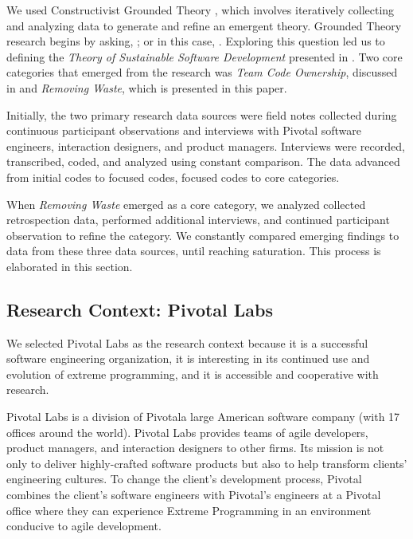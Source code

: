 We used Constructivist Grounded Theory \cite{Charmaz}, which involves iteratively collecting and analyzing data to generate and refine an emergent theory. Grounded Theory research begins by asking,  \cite{GlaserTheoreticalSensitivity}; or in this case, . Exploring this question led us to defining the \textit{Theory of Sustainable Software Development} presented in \cite{SedanoSustainableSoftware}. Two core categories that emerged from the research was \textit{Team Code Ownership}, discussed in \cite{SedanoTeamCodeOwnership} and \textit{Removing Waste}, which is presented in this paper.

Initially, the two primary research data sources were field notes collected during continuous participant observations and interviews with Pivotal software engineers, interaction designers, and product managers. Interviews were recorded, transcribed, coded, and analyzed using constant comparison. The data advanced from initial codes to focused codes, focused codes to core categories.

When \textit{Removing Waste} emerged as a core category, we analyzed collected retrospection data, performed additional interviews, and continued participant observation to refine the category.  We constantly compared emerging findings to data from these three data sources, until reaching saturation. This process is elaborated in this section.

\subsection{Research Context: Pivotal Labs}
We selected Pivotal Labs as the research context because it is a successful software engineering organization, it is interesting in its continued use and evolution of extreme programming, and it is accessible and cooperative with research. 

Pivotal Labs is a division of Pivotal\textemdash a large American software company (with 17 offices around the world). Pivotal Labs provides teams of agile developers, product managers, and interaction designers to other firms. Its mission is not only to deliver highly-crafted software products but also to help transform clients' engineering cultures. To change the client's development process, Pivotal combines the client's software engineers with Pivotal's engineers at a Pivotal office where they can experience Extreme Programming \cite{BeckExtremeProgramming2004} in an environment conducive to agile development. 

